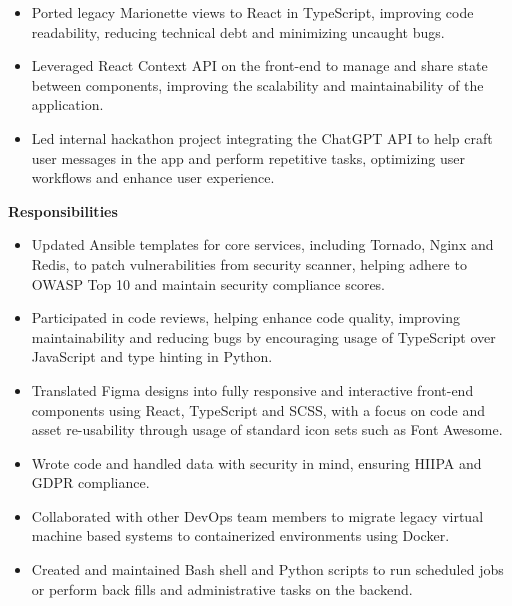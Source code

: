 \documentclass[11pt,a4paper,sans]{moderncv}        %
\begin{document}
{\begin{itemize}
            \item Ported legacy Marionette views to React in TypeScript, improving code readability, reducing technical debt and minimizing uncaught bugs.
            \item Leveraged React Context API on the front-end to manage and share state between components, improving the scalability and maintainability of the application.
            \item Led internal hackathon project integrating the ChatGPT API to help craft user messages in the app and perform repetitive tasks, optimizing user workflows and enhance user experience.
        \end{itemize}
        \textbf{Responsibilities}
        \begin{itemize}
                \item Updated Ansible templates for core services, including Tornado, Nginx and Redis, to patch vulnerabilities from security scanner, helping adhere to OWASP Top 10 and maintain security compliance scores.
                \item Participated in code reviews, helping enhance code quality, improving maintainability and reducing bugs by encouraging usage of TypeScript over JavaScript and type hinting in Python.
                \item Translated Figma designs into fully responsive and interactive front-end components using React, TypeScript and SCSS, with a focus on code and asset re-usability through usage of standard icon sets such as Font Awesome.
                \item Wrote code and handled data with security in mind, ensuring HIIPA and GDPR compliance.
                \item Collaborated with other DevOps team members to migrate legacy virtual machine based systems to containerized environments using Docker.
                \item Created and maintained Bash shell and Python scripts to run scheduled jobs or perform back fills and administrative tasks on the backend.
        \end{itemize}
    }
    
\end{document}
